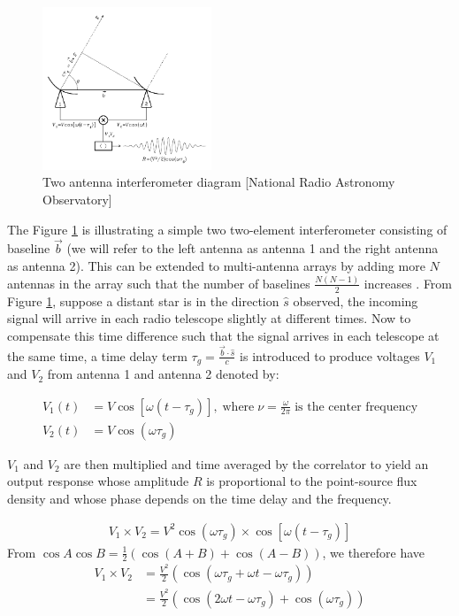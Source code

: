 \begin{figure}[h!]
  \centering
    \includegraphics[width=0.45\textwidth]{images/Rint.png}
    \caption{Two antenna interferometer diagram [National Radio Astronomy Observatory]}
  \label{images/Rint.png}
\end{figure}

The Figure \ref{images/Rint.png} is illustrating a simple two two-element interferometer consisting of baseline $\overrightarrow{b}$ (we will refer to the left antenna as antenna 1 and the right antenna as antenna 2). This can be extended to multi-antenna arrays by adding more $N$ antennas in the array such that the number of baselines  $\frac{N(N-1)}{2}$  increases \citep{zensus1995very}. From Figure \ref{images/Rint.png}, suppose a distant star is in the direction $\widehat{s}$ observed, the incoming signal will arrive in each radio telescope slightly at different times. Now to compensate this time difference such that the signal arrives in each telescope at the same time, a time delay term $\tau_{g}=\frac{\overrightarrow{b}\cdot\widehat{s}}{c}$ is introduced to produce voltages $V_1$ and $V_2$ from antenna 1 and antenna 2 denoted by: 

\begin{equation}\label{eq111}
\begin{split}
V_1(t)&=V\cos[\omega(t-\tau_{g})],\; \text{where} \;\nu=\frac{\omega}{2\pi}\; \text{is the center frequency} \\
V_2(t)&=V\cos(\omega\tau_{g})
\end{split}
\end{equation}

$V_1$ and $V_2$ are then  multiplied and time averaged by the correlator to yield an output response whose amplitude $R$ is proportional to the point-source flux density and whose phase depends on the time delay and the frequency.

\begin{align}
V_1 \times V_2 = V^2 \cos(\omega\tau_{g})\times \cos[\omega(t-\tau_{g})]
\end{align}
From $\cos A\cos B= \frac{1}{2} \left(\cos (A+B) + \cos (A-B) \right)$, 
we therefore have 
\begin{align*}
V_1 \times V_2&= \frac{V^2}{2} \left( \cos(\omega\tau_{g} + \omega t-\omega \tau_{g} )\right)\\
&= \frac{V^2}{2} \left(\cos(2\omega t - \omega \tau_{g}) + \cos (\omega\tau_{g})\right)
\end{align*}


